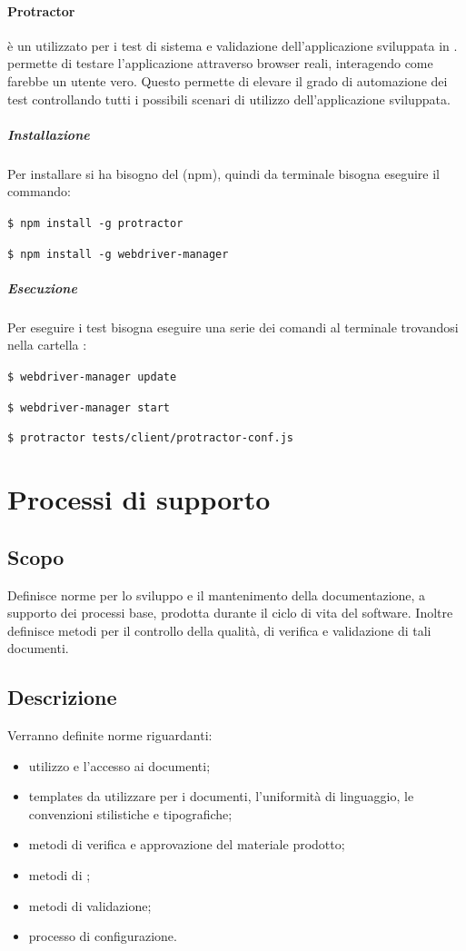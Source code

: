 \documentclass[12pt,a4paper]{article}
\begin{document}
\paragraph{Protractor} \label{protractor}
  è un  utilizzato per i test di sistema e validazione dell'applicazione sviluppata in .  permette di testare l'applicazione attraverso browser reali, interagendo come farebbe un utente vero.
Questo permette di elevare il grado di automazione dei test controllando tutti i possibili scenari di utilizzo dell'applicazione sviluppata.
\subparagraph{Installazione}
Per installare  si ha bisogno del  (npm), quindi da terminale bisogna eseguire il commando:
\begin{center}
	\texttt{\$ npm install -g protractor}
\end{center}
\begin{center}
	\texttt{\$ npm install -g webdriver-manager}  
\end{center}
\subparagraph{Esecuzione}
Per eseguire i test bisogna eseguire una serie dei comandi al terminale trovandosi nella cartella : 
\begin{center}
	\texttt{\$ webdriver-manager update}
\end{center}
\begin{center}
	\texttt{\$ webdriver-manager start}
\end{center}
\begin{center}
	\texttt{\$ protractor tests/client/protractor-conf.js}
\end{center}
\newpage

\section{Processi di supporto}

\subsection{Scopo}
Definisce norme per lo sviluppo e il mantenimento della documentazione, a supporto dei processi base, prodotta durante il ciclo di vita del software. Inoltre definisce metodi per il controllo della qualità, di verifica e validazione di tali documenti.

\subsection{Descrizione}
Verranno definite norme riguardanti:
\begin{itemize}
	\item utilizzo e l'accesso ai documenti;
	\item templates da utilizzare per i documenti, l'uniformità di linguaggio, le convenzioni stilistiche e tipografiche;
	\item metodi di verifica e approvazione del materiale prodotto;
	\item metodi di ;
	\item metodi di validazione;
	\item processo di configurazione.
\end{itemize}
\end{document}
